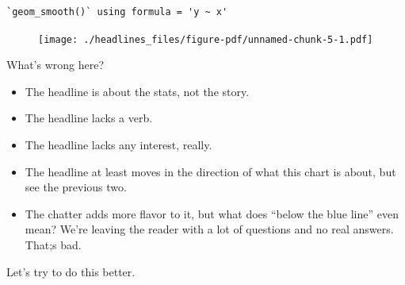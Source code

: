 \documentclass[
  letterpaper,
  DIV=11,
  numbers=noendperiod]{scrreprt}
\providecommand{\tightlist}{%
  \setlength{\itemsep}{0pt}\setlength{\parskip}{0pt}}\usepackage{longtable,booktabs,array}
\begin{document}
\begin{verbatim}
`geom_smooth()` using formula = 'y ~ x'
\end{verbatim}

\begin{figure}[H]

{\centering \texttt{[image: ./headlines\_files/figure-pdf/unnamed-chunk-5-1.pdf]}

}

\end{figure}

What's wrong here?

\begin{itemize}
\tightlist
\item
  The headline is about the stats, not the story.
\item
  The headline lacks a verb.
\item
  The headline lacks any interest, really.
\item
  The headline at least moves in the direction of what this chart is
  about, but see the previous two.
\item
  The chatter adds more flavor to it, but what does ``below the blue
  line'' even mean? We're leaving the reader with a lot of questions and
  no real answers. That;s bad.
\end{itemize}

Let's try to do this better.
\end{document}
